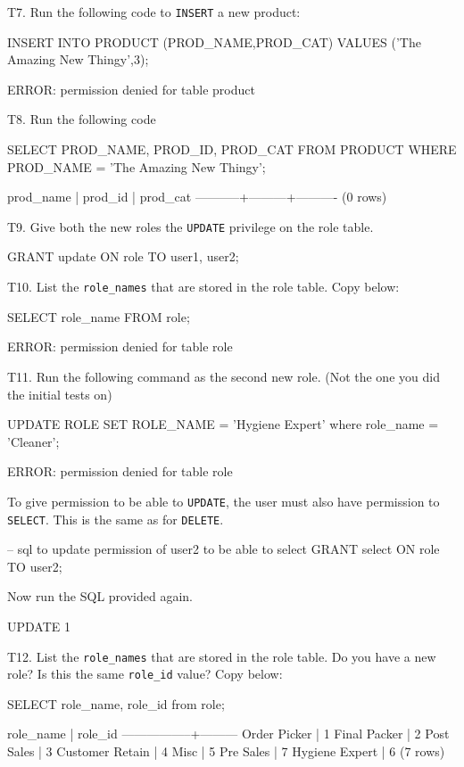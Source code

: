T7. Run the following code to \verb|INSERT| a new product:
\begin{sql}
INSERT INTO PRODUCT (PROD_NAME,PROD_CAT) VALUES ('The Amazing New Thingy',3);
\end{sql}
\begin{pseudo}
ERROR:  permission denied for table product
\end{pseudo}

T8. Run the following code
\begin{sql}
SELECT PROD_NAME, PROD_ID, PROD_CAT FROM PRODUCT WHERE PROD_NAME = 'The Amazing New Thingy';
\end{sql}
\begin{pseudo}
 prod_name | prod_id | prod_cat
-----------+---------+----------
(0 rows)
\end{pseudo}

T9. Give both the new roles the \verb|UPDATE| privilege on the role table.
\begin{sql}
GRANT update
ON role
TO user1, user2;
\end{sql}

T10. List the \verb|role_names| that are stored in the role table. Copy below:
\begin{sql}
SELECT role_name FROM role;
\end{sql}
\begin{pseudo}
ERROR:  permission denied for table role
\end{pseudo}

T11. Run the following command as the second new role. (Not the one you did the initial tests on)
\begin{sql}
UPDATE ROLE SET ROLE_NAME = 'Hygiene Expert' where role_name = 'Cleaner';
\end{sql}
\begin{pseudo}
ERROR:  permission denied for table role
\end{pseudo}
To give permission to be able to \verb|UPDATE|, the user must also have permission to \verb|SELECT|. This is the same as for \verb|DELETE|.
\begin{sql}
-- sql to update permission of user2 to be able to select
GRANT select ON role TO user2;
\end{sql}
Now run the SQL provided again.
\begin{pseudo}
UPDATE 1
\end{pseudo}

T12. List the \verb|role_names| that are stored in the role table. Do you have a new role? Is this the same \verb|role_id| value?  Copy below:
\begin{sql}
SELECT role_name, role_id from role;
\end{sql}
\begin{pseudo}
    role_name    | role_id
-----------------+---------
 Order Picker    |       1
 Final Packer    |       2
 Post Sales      |       3
 Customer Retain |       4
 Misc            |       5
 Pre Sales       |       7
 Hygiene Expert  |       6
(7 rows)
\end{pseudo}

